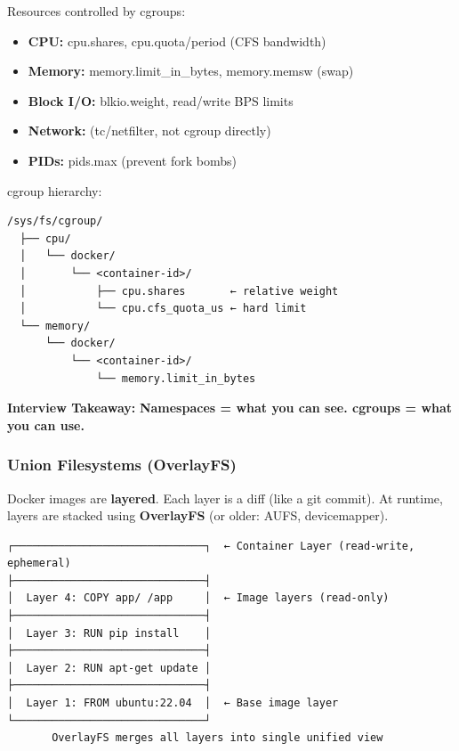 \documentclass[11pt]{article}
\providecommand{\tightlist}{\setlength{\itemsep}{1pt}\setlength{\parskip}{0pt}}
\begin{document}
Resources controlled by cgroups:

\begin{itemize}
\tightlist
\item
  \textbf{CPU:} cpu.shares, cpu.quota/period (CFS bandwidth)
\item
  \textbf{Memory:} memory.limit\_in\_bytes, memory.memsw (swap)
\item
  \textbf{Block I/O:} blkio.weight, read/write BPS limits
\item
  \textbf{Network:} (tc/netfilter, not cgroup directly)
\item
  \textbf{PIDs:} pids.max (prevent fork bombs)
\end{itemize}

cgroup hierarchy:

\setcodelang{}

\begin{verbatim}
/sys/fs/cgroup/
  ├── cpu/
  │   └── docker/
  │       └── <container-id>/
  │           ├── cpu.shares       ← relative weight
  │           └── cpu.cfs_quota_us ← hard limit
  └── memory/
      └── docker/
          └── <container-id>/
              └── memory.limit_in_bytes
\end{verbatim}

\textbf{Interview Takeaway:} \textbf{Namespaces = what you can see. cgroups = what you can use.}

\subsubsection{Union Filesystems (OverlayFS)}\label{union-filesystems-overlayfs}

Docker images are \textbf{layered}. Each layer is a diff (like a git commit). At runtime, layers are stacked using \textbf{OverlayFS} (or older: AUFS, devicemapper).

\setcodelang{}

\begin{verbatim}
┌──────────────────────────────┐  ← Container Layer (read-write, ephemeral)
├──────────────────────────────┤
│  Layer 4: COPY app/ /app     │  ← Image layers (read-only)
├──────────────────────────────┤
│  Layer 3: RUN pip install    │
├──────────────────────────────┤
│  Layer 2: RUN apt-get update │
├──────────────────────────────┤
│  Layer 1: FROM ubuntu:22.04  │  ← Base image layer
└──────────────────────────────┘
       OverlayFS merges all layers into single unified view
\end{verbatim}
\end{document}
